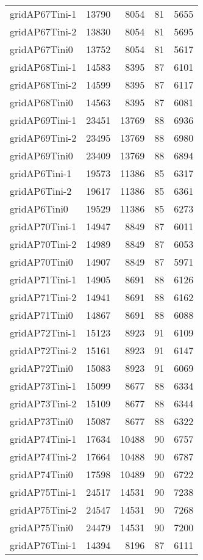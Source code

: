 \documentclass[../../../thesis.tex]{subfiles}
\begin{document}
\begin{longtable}{lrrrr}
gridAP67Tini-1 & 13790 & 8054 & 81 & 5655 \\
gridAP67Tini-2 & 13830 & 8054 & 81 & 5695 \\
gridAP67Tini0 & 13752 & 8054 & 81 & 5617 \\
gridAP68Tini-1 & 14583 & 8395 & 87 & 6101 \\
gridAP68Tini-2 & 14599 & 8395 & 87 & 6117 \\
gridAP68Tini0 & 14563 & 8395 & 87 & 6081 \\
gridAP69Tini-1 & 23451 & 13769 & 88 & 6936 \\
gridAP69Tini-2 & 23495 & 13769 & 88 & 6980 \\
gridAP69Tini0 & 23409 & 13769 & 88 & 6894 \\
gridAP6Tini-1 & 19573 & 11386 & 85 & 6317 \\
gridAP6Tini-2 & 19617 & 11386 & 85 & 6361 \\
gridAP6Tini0 & 19529 & 11386 & 85 & 6273 \\
gridAP70Tini-1 & 14947 & 8849 & 87 & 6011 \\
gridAP70Tini-2 & 14989 & 8849 & 87 & 6053 \\
gridAP70Tini0 & 14907 & 8849 & 87 & 5971 \\
gridAP71Tini-1 & 14905 & 8691 & 88 & 6126 \\
gridAP71Tini-2 & 14941 & 8691 & 88 & 6162 \\
gridAP71Tini0 & 14867 & 8691 & 88 & 6088 \\
gridAP72Tini-1 & 15123 & 8923 & 91 & 6109 \\
gridAP72Tini-2 & 15161 & 8923 & 91 & 6147 \\
gridAP72Tini0 & 15083 & 8923 & 91 & 6069 \\
gridAP73Tini-1 & 15099 & 8677 & 88 & 6334 \\
gridAP73Tini-2 & 15109 & 8677 & 88 & 6344 \\
gridAP73Tini0 & 15087 & 8677 & 88 & 6322 \\
gridAP74Tini-1 & 17634 & 10488 & 90 & 6757 \\
gridAP74Tini-2 & 17664 & 10488 & 90 & 6787 \\
gridAP74Tini0 & 17598 & 10489 & 90 & 6722 \\
gridAP75Tini-1 & 24517 & 14531 & 90 & 7238 \\
gridAP75Tini-2 & 24547 & 14531 & 90 & 7268 \\
gridAP75Tini0 & 24479 & 14531 & 90 & 7200 \\
gridAP76Tini-1 & 14394 & 8196 & 87 & 6111 \\

\end{longtable}
\end{document}
